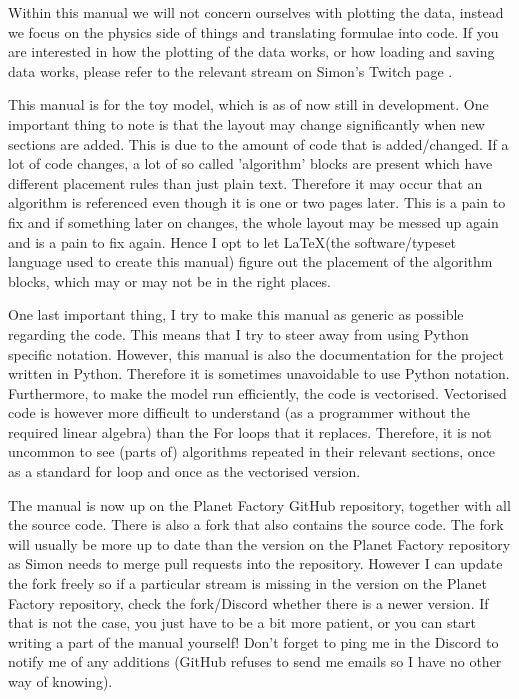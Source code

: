 \documentclass{article}
\begin{document}
Within this manual we will not concern ourselves with plotting the data, instead we focus on the physics side of things and translating formulae into code. If you are interested in how the
plotting of the data works, or how loading and saving data works, please refer to the relevant stream on Simon's Twitch page \cite{twitch}.

This manual is for the toy model, which is as of now still in development. One important thing to note is that the layout may change significantly when new sections are added. This is due to the 
amount of code that is added/changed. If a lot of code changes, a lot of so called 'algorithm' blocks are present which have different placement rules than just plain text. Therefore it may 
occur that an algorithm is referenced even though it is one or two pages later. This is a pain to fix and if something later on changes, the whole layout may be messed up again and is a pain to 
fix again. Hence I opt to let \LaTeX (the software/typeset language used to create this manual) figure out the placement of the algorithm blocks, which may or may not be in the right places.

One last important thing, I try to make this manual as generic as possible regarding the code. This means that I try to steer away from using Python specific notation. However, this manual is 
also the documentation for the project written in Python. Therefore it is sometimes unavoidable to use Python notation. Furthermore, to make the model run efficiently, the code is vectorised. 
Vectorised code is however more difficult to understand (as a programmer without the required linear algebra) than the For loops that it replaces. Therefore, it is not uncommon to see (parts of) 
algorithms repeated in their relevant sections, once as a standard for loop and once as the vectorised version.

The manual is now up on the Planet Factory GitHub repository\cite{claudeGit}, together with all the source code. There is also a fork \cite{nomGit} that also contains the source code. 
The fork will usually be more up to date than the version on the Planet Factory repository as Simon needs to merge pull requests into the repository. However I can update the fork freely so if a 
particular stream is missing in the version on the Planet Factory repository, check the fork/Discord whether there is a newer version. If that is not the case, you just have to be a bit more 
patient, or you can start writing a part of the manual yourself! Don't forget to ping me in the Discord to notify me of any additions (GitHub refuses to send me emails so I have no other way of 
knowing).
\end{document}
